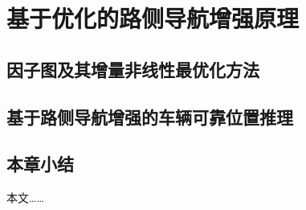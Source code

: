 \newpage
{}
\section{基于优化的路侧导航增强原理}

\subsection{因子图及其增量非线性最优化方法}


\subsection{基于路侧导航增强的车辆可靠位置推理}


\subsection{本章小结}
本文……